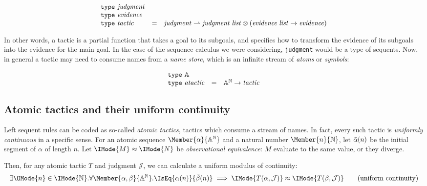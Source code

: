 \[
  \begin{array}{lcl}
    \mathtt{type}\ \mathit{judgment}\\
    \mathtt{type}\ \mathit{evidence}\\
    \mathtt{type}\ \mathit{tactic} &= &\mathit{judgment}\rightharpoonup \mathit{judgment}\;\mathit{list} \otimes (\mathit{evidence}\;\mathit{list}\to\mathit{evidence})
  \end{array}
\]

In other words, a tactic is a partial function that takes a goal to its
subgoals, and specifies how to transform the evidence of its subgoals into the
evidence for the main goal. In the case of the sequence calculus we were
considering, \verb!judgment! would be a type of sequents.  Now, in general a
tactic may need to consume names from a \emph{name store}, which is an infinite
stream of \emph{atoms} or \emph{symbols}:

\[
  \begin{array}{lcl}
    \mathtt{type}\ \mathbb{A}\\
    \mathtt{type}\ \mathit{atactic} &= &{\mathbb{A}}^{\mathbb{N}} \to \mathit{tactic}
  \end{array}
\]

\newcommand\KleeneEq[2]{\IMode{#1}\approx \IMode{#2}}
\newcommand\UMod[2]{\mathsf{umod}(#1,#2)}

\subsection{Atomic tactics and their uniform continuity}

Left sequent rules can be coded as so-called \emph{atomic tactics}, tactics which
consume a stream of names. In fact, every such tactic is \emph{uniformly
continuous} in a specific sense. For an atomic sequence
$\Member{\alpha}{\MLStream{\MLAtom}}$ and a natural number
$\Member{n}{\MLNat}$, let $\bar{\alpha}(n)$ be the initial segment of
$\alpha$ of length $n$. Let $\KleeneEq{M}{N}$ be \emph{observational equivalence}:
$M$ evaluate to the same value, or they diverge.

Then, for any atomic tactic $T$ and judgment $\mathcal{J}$, we can calculate a
uniform modulus of continuity:
\begin{equation}
  \exists \OMode{n}\in\IMode{\MLNat}.
  \forall \Member{\alpha,\beta}{\MLStream{\MLAtom}}.
    \IsEq{\bar{\alpha}(n)}{\bar{\beta}(n)}\implies \KleeneEq{T(\alpha,\mathcal{J})}{T(\beta,\mathcal{J})}
  \tag{uniform continuity}
\end{equation}

